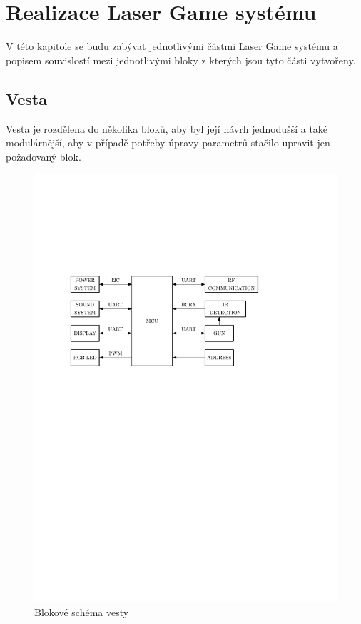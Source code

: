 \chapter{Realizace Laser Game systému}

 V této kapitole se budu zabývat jednotlivými částmi Laser Game systému a popisem souvislostí mezi jednotlivými bloky z kterých jsou tyto části vytvořeny.

\section{Vesta}

Vesta je rozdělena do několika bloků, aby byl její návrh jednodušší a také modulárnější, aby v případě potřeby úpravy parametrů stačilo upravit jen požadovaný blok.

\begin{figure}[H]
    \begin{center}
        \includegraphics[width=\textwidth]{img/vest-system}
    \end{center}
    \caption{Blokové schéma vesty}
\end{figure}

